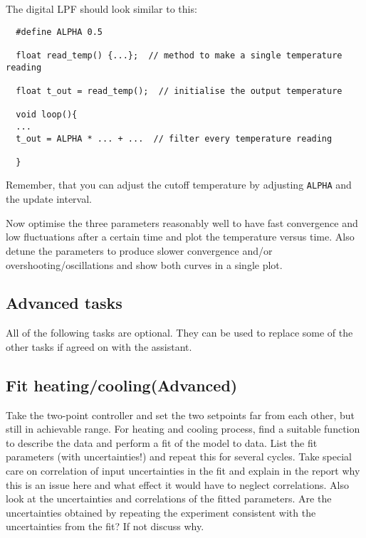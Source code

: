 %
The digital \ac{LPF} should look similar to this:
\begin{verbatim}
  #define ALPHA 0.5
  
  float read_temp() {...};  // method to make a single temperature reading
  
  float t_out = read_temp();  // initialise the output temperature
  
  void loop(){
  ...
  t_out = ALPHA * ... + ...  // filter every temperature reading
  
  }
\end{verbatim}
Remember, that you can adjust the cutoff temperature by adjusting \texttt{ALPHA} and the update interval.\par
%
\begin{task}
  Now optimise the three parameters reasonably well to have fast convergence and low fluctuations after a certain time and plot the temperature versus time. Also detune the parameters to produce slower convergence and/or overshooting/oscillations and show both curves in a single plot.
\end{task}
%
\subsection{Advanced tasks}
%
\begin{note}
  All of the following tasks are optional. They can be used to replace some of the other tasks if agreed on with the assistant.
\end{note}
%
\subsection{Fit heating/cooling(Advanced)}
Take the two-point controller and set the two setpoints far from each other, but still in achievable range. For heating and cooling process, find a suitable function to describe the data and perform a fit of the model to data. List the fit parameters (with uncertainties!) and repeat this for several cycles. Take special care on correlation of input uncertainties in the fit and explain in the report why this is an issue here and what effect it would have to neglect correlations. Also look at the uncertainties and correlations of the fitted parameters.
Are the uncertainties obtained by repeating the experiment consistent with the uncertainties from the fit? If not discuss why.

